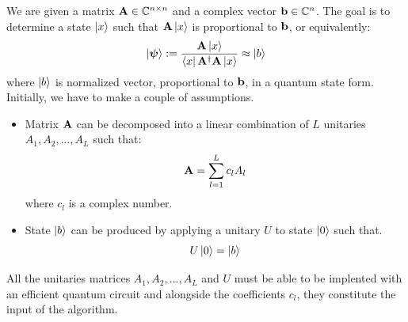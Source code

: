 \documentclass[12pt]{article}
\begin{document}
We are given a matrix ${\bf A} \in \mathbb{C}^{n\times n}$ and a complex vector ${\bf b} \in \mathbb{C}^n $.
 The goal is to determine a state $\left\vert{x}\right\rangle$ such that ${\bf A}\left\vert{x}\right\rangle$ is proportional to ${\bf b}$, or equivalently:
$$\left\vert{\boldsymbol \psi}\right\rangle := \frac{{\bf A}\left\vert{x}\right\rangle}{\left\langle{x}\right\vert{\bf A}^\dag {\bf A}\left\vert{x}\right\rangle} \approx \left\vert{b}\right\rangle $$
where $\left\vert{b}\right\rangle$ is normalized vector, proportional to $\bf b$, in a quantum state form. 
Initially, we have to make a couple of assumptions. 
\begin{itemize}
   \item Matrix ${\bf A}$ can be decomposed into a linear combination of $L$ unitaries $A_1,A_2,...,A_{L}$
such that:
$${\bf A} = \sum_{l = 1}^{L}c_lA_l$$
where $c_l$ is a complex number. 
\item State $\left\vert{b}\right\rangle$ can be produced by applying a unitary $U$ to state $\left\vert{0}\right\rangle$ such that.
$$U\left\vert{0}\right\rangle = \left\vert{b}\right\rangle$$
\end{itemize}
All the unitaries matrices $A_1,A_2,...,A_L$ and $U$ must be able to be implented with an efficient quantum circuit
and alongside the coefficients $c_l$, they constitute the input of the algorithm.\\
\end{document}
